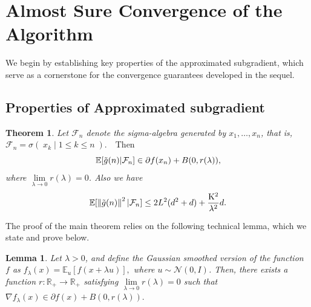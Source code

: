 \documentclass[9pt,journal,twoside,web]{ieeecolor}
\newtheorem{theorem}{Theorem}
\newtheorem{lemma}{Lemma}
\newcommand{\norm}[1]{\left\lVert #1 \right\rVert}
\begin{document}
\section{Almost Sure Convergence of the Algorithm}
We begin by establishing key properties of the approximated subgradient, which  serve as a cornerstone for the convergence guarantees developed in the sequel.

\subsection{Properties of Approximated subgradient}

\begin{theorem}
    Let $\mathcal{F}_n$ denote the sigma-algebra generated by $x_1,\ldots,x_n$, that is, $ \mathcal{F}_n = \sigma ( \; x_k \; | \; 1 \leq k \leq n \; ). \quad \text{Then} $
\begin{equation}
        \mathbb{E}[\Tilde{g}(n) | \mathcal{F}_n] \in \partial f(x_n) + B(0,r(\lambda)),
        \label{expectation}
    \end{equation}
   where $\lim\limits_{\lambda \to 0} r (\lambda) = 0$. Also we have 
\begin{equation}
        \mathbb{E}[\norm{\Tilde{g}(n)}^2 | \mathcal{F}_n] \leq 2 L^2 (d^2 + d)  + \frac{\mathrm{K}^2}{\lambda^2} d. 
        \label{variance}
    \end{equation}
    \label{property}
\end{theorem}
The proof of the main theorem relies on the following technical lemma, which we state and prove below. 

\begin{lemma}
    Let $\lambda > 0$,  and define the Gaussian smoothed version of the function $f$ as  
    $
        f_\lambda (x) = \mathbb{E}_u [f(x+\lambda u)], 
    $
where $u \sim \mathcal{N}(0,I)$.
    Then, there exists a function $r : \mathbb{R}_{+} \to \mathbb{R}_{+} $ satisfying $\lim\limits_{\lambda \to 0} r(\lambda) = 0$ such that
    $
        \nabla f_\lambda (x) \in \partial f(x) + B(0,r(\lambda)).
    $
    \label{conv}
\end{lemma}
\end{document}
